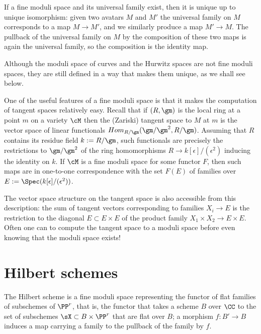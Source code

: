 If a fine moduli space and its universal family exist, then it is unique up to unique isomorphism: given two avatars $M$ and $M'$
the universal family on $M$ corresponds to a map $M\to M'$, and we similarly produce a map $M'\to M$. The pullback of the universal family on $M$ by the composition of these two maps is again the universal family, so the composition is the identity map.

Although the moduli space of curves and the Hurwitz spaces are not fine moduli spaces, they are still defined
in a way that makes them unique, as we shall see below.

\def\eps{{\epsilon}}
One of the useful features of a fine moduli space is that it makes the computation of tangent spaces relatively easy.
Recall that if $(R,\gm)$ is the local ring at a point $m$ on a variety $\cM$ then the (Zariski) tangent
space to $M$ at $m$ is the vector space of linear functionals $Hom_{R/\gm}(\gm/\gm^2, R/\gm)$.   Assuming that
$R$ contains its residue field $k := R/\gm$, such functionals
are precisely the restrictions to $\gm/\gm^2$ of the ring homomorphisms $R \to k[\eps]/(\eps^2)$ inducing the identity on $k$.
 If $\cM$ is a fine moduli space for some functor $F$, then such maps are in one-to-one correspondence
with the set $F(E)$ of families over $E := \Spec(k[\eps]/(\eps^2))$. 


The vector space structure on the tangent space is also accessible from this description:  the
 sum of tangent vectors corresponding to families $X_i \to E$ is the restriction to the diagonal
 $E \subset E\times E$
 of the product family $X_1 \times X_2 \to E\times E$.
Often one can to compute the tangent space to a moduli space before even knowing that the moduli space exists!


\section{Hilbert schemes}\label{hilbert scheme section}

The Hilbert scheme is a fine moduli space representing the functor of flat families of subschemes of $\PP^r$,
that is, the functor that takes a scheme $B$ over $\CC$ to the set of subschemes $\sX \subset B\times \PP^r$
that are flat over $B$; a morphism $f: B'\to B$ induces a map carrying a family to the pullback of the family by $f$.

